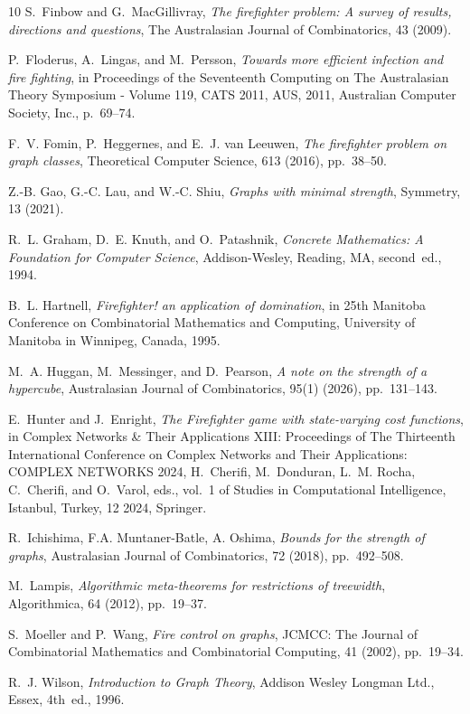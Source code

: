 \documentclass[unknownkeysallowed]{article}
\theoremstyle{definition}\newtheorem{strategy}{Strategy}
\theoremstyle{definition}\newtheorem{notation}{Notation}[theorem]
\begin{document}
\begin{thebibliography}{10}
{\sc S.~Finbow and G.~MacGillivray}, {\em The firefighter problem: A survey of results, directions and questions}, The Australasian Journal of Combinatorics, 43 (2009).

{\sc P.~Floderus, A.~Lingas, and M.~Persson}, {\em Towards more efficient infection and fire fighting}, in Proceedings of the Seventeenth Computing on The Australasian Theory Symposium - Volume 119, {CATS} 2011, AUS, 2011, Australian Computer Society, Inc., p.~69–74.

{\sc F.~V. Fomin, P.~Heggernes, and E.~J. {van Leeuwen}}, {\em The firefighter problem on graph classes}, Theoretical Computer Science, 613 (2016), pp.~38--50.

{\sc Z.-B. Gao, G.-C. Lau, and W.-C. Shiu}, {\em Graphs with minimal strength}, Symmetry, 13 (2021).

{\sc R.~L. Graham, D.~E. Knuth, and O.~Patashnik}, {\em Concrete Mathematics: A Foundation for Computer Science}, Addison-Wesley, Reading, MA, second~ed., 1994.

{\sc B.~L. Hartnell}, {\em Firefighter! an application of domination}, in 25th Manitoba Conference on Combinatorial Mathematics and Computing, University of Manitoba in Winnipeg, Canada, 1995.

{\sc M.~A. Huggan, M.~Messinger, and D.~Pearson}, {\em A note on the strength of a hypercube}, Australasian Journal of Combinatorics, 95(1) (2026), pp.~131--143.

{\sc E.~Hunter and J.~Enright}, {\em The {Firefighter} game with state-varying cost functions}, in {Complex Networks \& Their Applications XIII}: Proceedings of The Thirteenth International Conference on Complex Networks and Their Applications: {COMPLEX NETWORKS 2024}, H.~Cherifi, M.~Donduran, L.~M. Rocha, C.~Cherifi, and O.~Varol, eds., vol.~1 of Studies in Computational Intelligence, Istanbul, Turkey, 12 2024, Springer.

 R.~Ichishima, F.A. Muntaner-Batle, A. Oshima, {\em Bounds for the strength of graphs}, Australasian Journal of Combinatorics, 72 (2018), pp.~492--508.

{\sc M.~Lampis}, {\em Algorithmic meta-theorems for restrictions of treewidth}, Algorithmica, 64 (2012), pp.~19--37.

{\sc S.~Moeller and P.~Wang}, {\em Fire control on graphs}, JCMCC: The Journal of Combinatorial Mathematics and Combinatorial Computing, 41 (2002), pp.~19--34.

{\sc R.~J. Wilson}, {\em Introduction to Graph Theory}, Addison Wesley Longman Ltd., Essex, 4th~ed., 1996.

\end{thebibliography}
\end{document}
